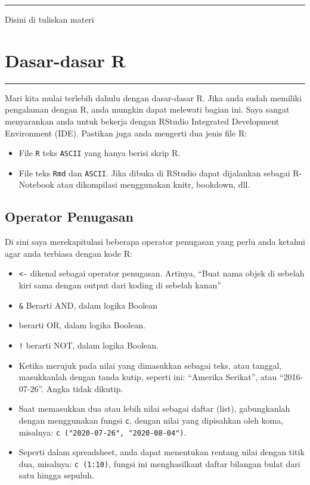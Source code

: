 \documentclass[
]{book}
\providecommand{\tightlist}{%
  \setlength{\itemsep}{0pt}\setlength{\parskip}{0pt}}
\begin{document}
\begin{center}\rule{0.5\linewidth}{0.5pt}\end{center}

Disini di tuliskan materi

\hypertarget{Dasar-R}{%
\chapter{Dasar-dasar R}\label{Dasar-R}}

\begin{center}\rule{0.5\linewidth}{0.5pt}\end{center}

Mari kita mulai terlebih dahulu dengan dasar-dasar R. Jika anda sudah memiliki pengalaman dengan R, anda mungkin dapat melewati bagian ini. Saya sangat menyarankan anda untuk bekerja dengan RStudio Integrated Development Environment (IDE). Pastikan juga anda mengerti dua jenis file R:

\begin{itemize}
\tightlist
\item
  File \texttt{R} teks \texttt{ASCII} yang hanya berisi skrip R.
\item
  File teks \texttt{Rmd} dan \texttt{ASCII}. Jika dibuka di RStudio dapat dijalankan sebagai R-Notebook atau dikompilasi menggunakan knitr, bookdown, dll.
\end{itemize}

\hypertarget{operator-penugasan}{%
\section{Operator Penugasan}\label{operator-penugasan}}

Di sini saya merekapitulasi beberapa operator penugasan yang perlu anda ketahui agar anda terbiasa dengan kode R:

\begin{itemize}
\tightlist
\item
  \texttt{\textless{}-} dikenal sebagai operator penugasan. Artinya, ``Buat nama objek di sebelah kiri sama dengan output dari koding di sebelah kanan''
\item
  \texttt{\&} Berarti AND, dalam logika Boolean
\item
  \texttt{\textbar{}} berarti OR, dalam logika Boolean.
\item
  \texttt{!} berarti NOT, dalam logika Boolean.
\item
  Ketika merujuk pada nilai yang dimasukkan sebagai teks, atau tanggal, masukkanlah dengan tanda kutip, seperti ini: ``Amerika Serikat'', atau ``2016-07-26''. Angka tidak dikutip.
\item
  Saat memasukkan dua atau lebih nilai sebagai daftar (list), gabungkanlah dengan menggunakan fungsi \texttt{c}, dengan nilai yang dipisahkan oleh koma, misalnya: \texttt{c\ ("2020-07-26",\ "2020-08-04")}.
\item
  Seperti dalam spreadsheet, anda dapat menentukan rentang nilai dengan titik dua, misalnya: \texttt{c\ (1:10)}, fungsi ini menghasilkant daftar bilangan bulat dari satu hingga sepuluh.
\end{itemize}
\end{document}
